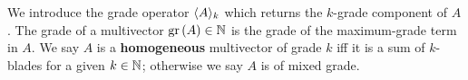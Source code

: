 \begin{definition}[Grade]
	We introduce the grade operator $\langle A \rangle_{k}$ which returns the $k$-grade component of $A$.
	The grade of a multivector $\mathrm{gr}\left(A\right) \in \mathbb{N}$ is the grade of the maximum-grade term in $A$.
	We say $A$ is a \textbf{homogeneous} multivector of grade $k$ iff it is a sum of $k$-blades for a given $k \in \mathbb{N}$; otherwise we say $A$ is of mixed grade.
\end{definition}
